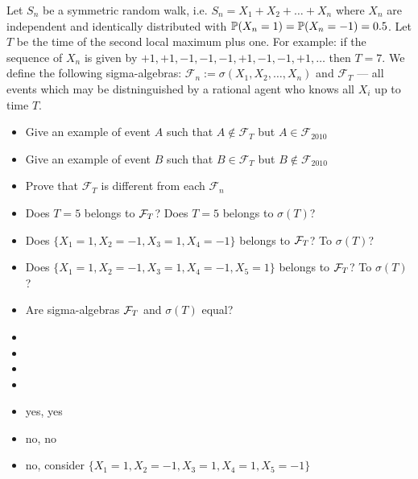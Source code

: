 \begin{problem}
Let $ S_{n} $ be a symmetric random walk, i.e. $ S_{n}=X_{1}+X_{2}+\ldots+X_{n} $ where $ X_{n} $ are independent and identically distributed with $ \P(X_{n}=1)=\P(X_{n}=-1)=0.5 $. Let $T$ be the time of the second local maximum plus one. For example: if the sequence of $ X_{n} $ is given by $ +1,+1,-1,-1,-1,+1,-1,-1,+1,\ldots$ then $T=7$. We define the following sigma-algebras: $ \mathcal{F}_{n}:=\sigma(X_{1},X_{2},\ldots,X_{n})$ and $ \mathcal{F}_{T} $ — all events which may be distninguished by a rational agent who knows all $ X_{i} $ up to time $ T $.
\begin{itemize}
\item Give an example of event $A$ such that $ A\notin \mathcal{F}_{T} $ but $ A\in \mathcal{F}_{2010} $
\item Give an example of event $B$ such that $ B\in \mathcal{F}_{T} $ but $ B\notin \mathcal{F}_{2010} $
\item Prove that $ \mathcal{F}_{T} $ is different from each $ \mathcal{F}_{n} $
\item Does $T=5$ belongs to $\cF_T$? Does $T=5$ belongs to $\sigma(T)$?
\item Does $\{X_1 = 1, X_2 = -1, X_3 = 1, X_4 = -1 \}$ belongs to $\cF_T$? To $\sigma(T)$?
\item Does $\{X_1 = 1, X_2 = -1, X_3 = 1, X_4 = -1, X_5 = 1 \}$ belongs to $\cF_T$? To $\sigma(T)$?
\item Are sigma-algebras $\cF_T$ and $\sigma(T)$ equal?
\end{itemize}


\begin{sol}
  \begin{itemize}
    \item
    \item
    \item
    \item
    \item yes, yes
    \item no, no
    \item no, consider $\{X_1 = 1, X_2 = -1, X_3 = 1, X_4 = 1, X_5 = -1 \}$
  \end{itemize}
\end{sol}
\end{problem}

